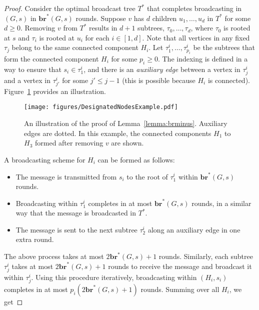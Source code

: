 \documentclass[letterpaper,11pt]{article}
\newcommand{\bropt}{{\boldsymbol{br}^*}}
\begin{document}
\begin{proof}
Consider the optimal broadcast tree $T^*$ that completes broadcasting in $(G,s)$ in $\bropt(G,s)$ rounds. Suppose $v$ has $d$ children $u_1, \dots, u_d$ in $T^*$ for some $d \geq 0$. Removing $v$ from $T^*$ results in $d+1$ subtrees, $\tau_0, \dots, \tau_d$, where $\tau_0$ is rooted at $s$ and $\tau_i$ is rooted at $u_i$ for each $i \in [1,d]$. Note that all vertices in any fixed $\tau_j$ belong to the same connected component $H_i$.
Let $\tau^i_1, \dots, \tau^i_{p_i}$ be the subtrees that form the connected component $H_i$ for some $p_i \geq 0$. The indexing is defined in a way to ensure that $s_i \in \tau^i_1$, and there is an \emph{auxiliary edge} between a vertex in $\tau^i_{j}$ and a vertex in $\tau^i_{j'}$ for some $j' \leq j-1$ (this is possible because $H_i$ is connected). Figure~\ref{fig:designatedNodesExample} provides an illustration.

     \begin{figure}
	\centering
	\texttt{[image: figures/DesignatedNodesExample.pdf]}
	\caption{An illustration of the proof of Lemma~\ref{lemma:brminus}. Auxiliary edges are dotted. 
    In this example, the connected components $H_1$ to $H_3$ formed after removing $v$ are shown. 
    }
    
    \label{fig:designatedNodesExample}
    \end{figure}
    
A broadcasting scheme for $H_i$ can be formed as follows:
\begin{itemize}
\item The message is transmitted from $s_i$ to the root of $\tau^i_1$ within $\bropt(G,s)$ rounds.
\item Broadcasting within $\tau^i_1$ completes in at most $\bropt(G,s)$ rounds, in a similar way that the message is broadcasted in $T^*$.
\item The message is sent to the next subtree $\tau^i_2$ along an auxiliary edge in one extra round.
\end{itemize}

The above process takes at most $2\bropt(G,s) +1$ rounds. 
Similarly, each subtree $\tau^i_j$ takes at most $2\bropt(G,s)+1$ rounds to receive the message and broadcast it within $\tau^i_j$. Using this procedure iteratively, broadcasting within $(H_i, s_i)$ completes in at most $p_i(2\bropt(G,s)+1)$ rounds.
Summing over all $H_i$, we get

\scalebox{.9}{
\begin{minipage}{1.2\textwidth}
\begin{align*}
    \sum_{i \in[m]} \bropt(H_i,s_i) = (2\bropt(G,s)+1) \sum_{i \in[m]} p_i.
\end{align*}
\vspace{1mm}
\end{minipage}}


\end{proof}
\end{document}

